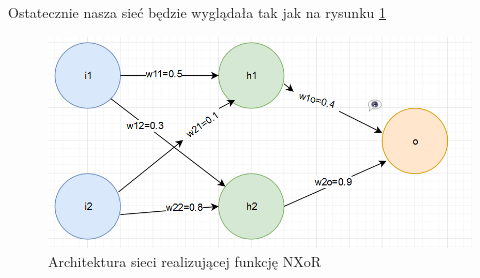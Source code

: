 Ostatecznie nasza sieć będzie wyglądała tak jak na rysunku \ref{fig:architecture}

\begin{figure}[!ht]
  \includegraphics[width=\linewidth]{images/architecture.png}
  \caption{Architektura sieci realizującej funkcję NXoR}
  \label{fig:architecture}
\end{figure}


